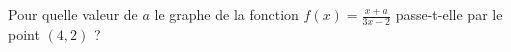 
\begin{exercice}\label{exosmath-0335}

    Pour quelle valeur de \( a\) le graphe de la fonction \( f(x)=\frac{ x+a }{ 3x-2 }\) passe-t-elle par le point \( (4,2)\) ?

\end{exercice}
